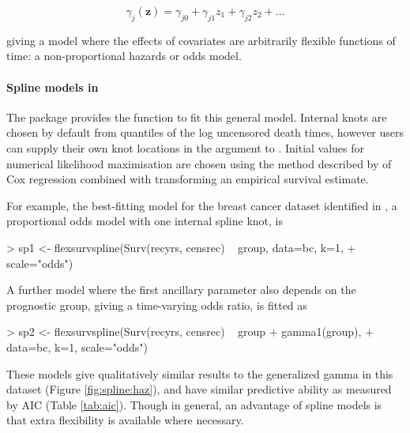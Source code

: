 \documentclass[nojss,nofooter]{jss}
\begin{document}
\[\gamma_j(\mathbf{z}) = \gamma_{j0} + \gamma_{j1}z_1 + \gamma_{j2}z_2 + \ldots\]

giving a model where the effects of covariates are arbitrarily flexible
functions of time: a non-proportional hazards or odds model.

\paragraph{Spline models in }

The package provides the function  to fit this
general model. Internal knots are chosen by default from quantiles of
the log uncensored death times, however users can supply their own
knot locations in the  argument to .
Initial values for numerical likelihood maximisation are chosen using
the method described by \citet{royston:parmar} of Cox regression
combined with transforming an empirical survival estimate.

For example, the best-fitting model for the breast cancer dataset identified in \citet{royston:parmar},
a proportional odds model with one internal spline knot, is
\begin{Schunk}
\begin{Sinput}
> sp1 <- flexsurvspline(Surv(recyrs, censrec) ~ group, data=bc, k=1, 
+                       scale="odds")
\end{Sinput}
\end{Schunk}
A further model where the first ancillary parameter also depends on the prognostic
group, giving a time-varying odds ratio, is fitted as
\begin{Schunk}
\begin{Sinput}
> sp2 <- flexsurvspline(Surv(recyrs, censrec) ~ group + gamma1(group),
+                       data=bc, k=1, scale="odds")
\end{Sinput}
\end{Schunk}
These models give qualitatively similar results to the generalized
gamma in this dataset (Figure \ref{fig:spline:haz}), and have similar
predictive ability as measured by AIC (Table \ref{tab:aic}). Though in
general, an advantage of spline models is that extra flexibility is
available where necessary.

\end{document}
